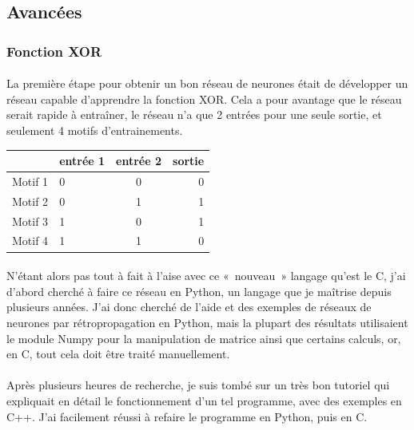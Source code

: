 \documentclass{article}
\begin{document}
\subsection{Avancées}

\subsubsection{Fonction XOR}

\paragraph{} La première étape pour obtenir un bon réseau de neurones était de développer un réseau capable d'apprendre la fonction XOR. Cela a pour avantage que le réseau serait rapide à entraîner, le réseau n'a que 2 entrées pour une seule sortie, et seulement 4 motifs d'entrainements.

\begin{center}
\vspace*{0.2cm}
\begin{tabular}{|l|l|c|r|}
  \hline
  & entrée 1 & entrée 2 & sortie \\
  \hline
  Motif 1 & 0 & 0 & 0 \\
  Motif 2 & 0 & 1 & 1 \\
  Motif 3 & 1 & 0 & 1 \\
  Motif 4 & 1 & 1 & 0 \\
  \hline
\end{tabular}
\end{center}


\paragraph{}N'étant alors pas tout à fait à l'aise avec ce « nouveau » langage qu'est le C, j'ai d'abord cherché à faire ce réseau en Python, un langage que je maîtrise depuis plusieurs années. J'ai donc cherché de l'aide et des exemples de réseaux de neurones par rétropropagation en Python, mais la plupart des résultats utilisaient le module Numpy pour la manipulation de matrice ainsi que certains calculs, or, en C, tout cela doit être traité manuellement.

\paragraph{}Après plusieurs heures de recherche, je suis tombé sur un très bon tutoriel qui expliquait en détail le fonctionnement d'un tel programme, avec des exemples en C++. J'ai facilement réussi à refaire le programme en Python, puis en C.
\end{document}
